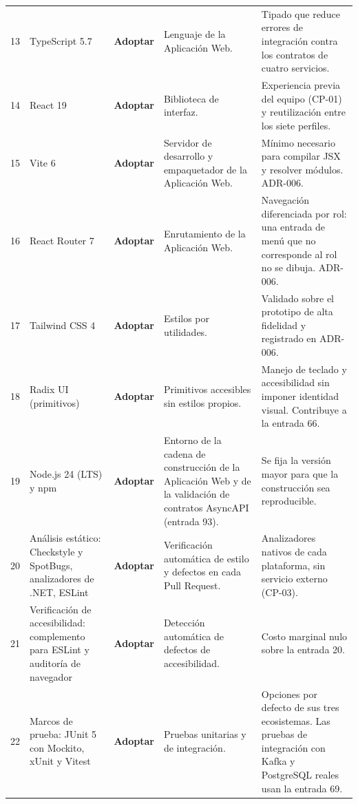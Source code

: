 \documentclass[11pt,a4paper]{article}
\newcommand{\adoptar}{\textcolor{ringAdoptar}{\textbf{Adoptar}}}
\begin{document}
\begin{longtable}{L{0.8cm} L{2.6cm} L{1.6cm} L{4.1cm} L{4.5cm}}
13 & TypeScript 5.7 & \adoptar{} & Lenguaje de la Aplicación Web. & Tipado que reduce errores de integración contra los contratos de cuatro servicios. \\

14 & React 19 & \adoptar{} & Biblioteca de interfaz. & Experiencia previa del equipo (CP-01) y reutilización entre los siete perfiles. \\

15 & Vite 6 & \adoptar{} & Servidor de desarrollo y empaquetador de la Aplicación Web. & Mínimo necesario para compilar JSX y resolver módulos. ADR-006. \\

16 & React Router 7 & \adoptar{} & Enrutamiento de la Aplicación Web. & Navegación diferenciada por rol: una entrada de menú que no corresponde al rol no se dibuja. ADR-006. \\

17 & Tailwind CSS 4 & \adoptar{} & Estilos por utilidades. & Validado sobre el prototipo de alta fidelidad y registrado en ADR-006. \\

18 & Radix UI (primitivos) & \adoptar{} & Primitivos accesibles sin estilos propios. & Manejo de teclado y accesibilidad sin imponer identidad visual. Contribuye a la entrada 66. \\

19 & Node.js 24 (LTS) y npm & \adoptar{} & Entorno de la cadena de construcción de la Aplicación Web y de la validación de contratos AsyncAPI (entrada 93). & Se fija la versión mayor para que la construcción sea reproducible. \\

20 & Análisis estático: Checkstyle y SpotBugs, analizadores de .NET, ESLint & \adoptar{} & Verificación automática de estilo y defectos en cada Pull Request. & Analizadores nativos de cada plataforma, sin servicio externo (CP-03). \\

21 & Verificación de accesibilidad: complemento para ESLint y auditoría de navegador & \adoptar{} & Detección automática de defectos de accesibilidad. & Costo marginal nulo sobre la entrada 20. \\

22 & Marcos de prueba: JUnit 5 con Mockito, xUnit y Vitest & \adoptar{} & Pruebas unitarias y de integración. & Opciones por defecto de sus tres ecosistemas. Las pruebas de integración con Kafka y PostgreSQL reales usan la entrada 69. \\


\end{longtable}
\end{document}
